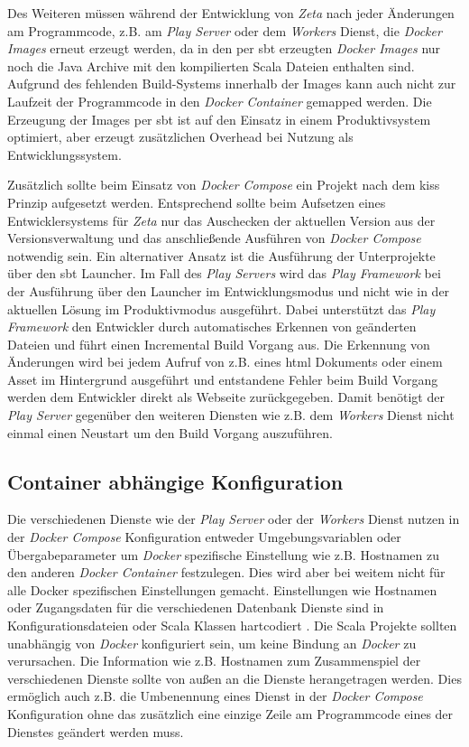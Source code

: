 Des Weiteren müssen während der Entwicklung von \textit{Zeta} nach jeder Änderungen am Programmcode, z.B. am \textit{Play Server} oder dem \textit{Workers} Dienst, die \textit{Docker Images} erneut erzeugt werden, da in den per \ac{sbt} erzeugten \textit{Docker Images} nur noch die Java Archive mit den kompilierten Scala Dateien enthalten sind. Aufgrund des fehlenden Build-Systems innerhalb der Images kann auch nicht zur Laufzeit der Programmcode in den \textit{Docker Container} gemapped werden. Die Erzeugung der Images per \ac{sbt} ist auf den Einsatz in einem Produktivsystem optimiert, aber erzeugt zusätzlichen Overhead bei Nutzung als Entwicklungssystem.

Zusätzlich sollte beim Einsatz von \textit{Docker Compose} ein Projekt nach dem \ac{kiss} Prinzip aufgesetzt werden. Entsprechend sollte beim Aufsetzen eines Entwicklersystems für \textit{Zeta} nur das Auschecken der aktuellen Version aus der Versionsverwaltung und das anschließende Ausführen von \textit{Docker Compose} notwendig sein. Ein alternativer Ansatz ist die Ausführung der Unterprojekte über den \ac{sbt} Launcher. Im Fall des \textit{Play Servers} wird das \textit{Play Framework} bei der Ausführung über den Launcher im Entwicklungsmodus und nicht wie in der aktuellen Lösung im Produktivmodus ausgeführt. Dabei unterstützt das \textit{Play Framework} den Entwickler durch automatisches Erkennen von geänderten Dateien und führt einen Incremental Build Vorgang aus. Die Erkennung von Änderungen wird bei jedem Aufruf von z.B. eines \ac{html} Dokuments oder einem Asset im Hintergrund ausgeführt und entstandene Fehler beim Build Vorgang werden dem Entwickler direkt als Webseite zurückgegeben. Damit benötigt der \textit{Play Server} gegenüber den weiteren Diensten wie z.B. dem \textit{Workers} Dienst nicht einmal einen Neustart um den Build Vorgang auszuführen.

\subsection{Container abhängige Konfiguration}

Die verschiedenen Dienste wie der \textit{Play Server} oder der \textit{Workers} Dienst nutzen in der \textit{Docker Compose} Konfiguration entweder Umgebungsvariablen oder Übergabeparameter um \textit{Docker} spezifische Einstellung wie z.B. Hostnamen zu den anderen \textit{Docker Container} festzulegen. Dies wird aber bei weitem nicht für alle Docker spezifischen Einstellungen gemacht. Einstellungen wie Hostnamen oder Zugangsdaten für die verschiedenen Datenbank Dienste sind in Konfigurationsdateien oder Scala Klassen hartcodiert \cite{zeta_docker_mongodb,zeta_docker_couchbase_admin,zeta_docker_couchbase_public,zeta_docker_play_seeds,zeta_docker_remote_api}. Die Scala Projekte sollten unabhängig von \textit{Docker} konfiguriert sein, um keine Bindung an \textit{Docker} zu verursachen. Die Information wie z.B. Hostnamen zum Zusammenspiel der verschiedenen Dienste sollte von außen an die Dienste herangetragen werden. Dies ermöglich auch z.B. die Umbenennung eines Dienst in der \textit{Docker Compose} Konfiguration ohne das zusätzlich eine einzige Zeile am Programmcode eines der Dienstes geändert werden muss.

